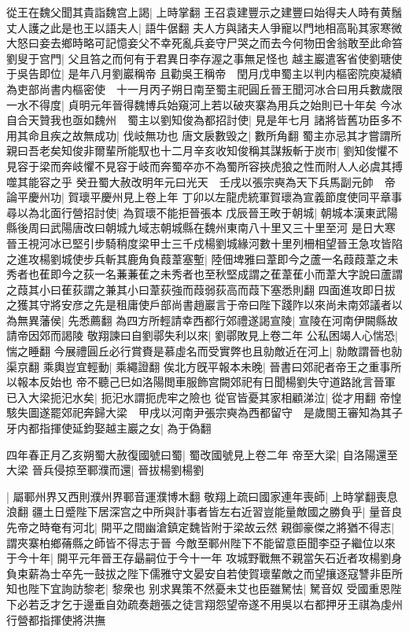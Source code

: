 從王在魏父聞其貴詣魏宫上謁|{
	上時掌翻}
王召袁建豐示之建豐曰始得夫人時有黄鬚丈人護之此是也王以語夫人|{
	語牛倨翻}
夫人方與諸夫人爭寵以門地相高恥其家寒微大怒曰妾去鄉時略可記憶妾父不幸死亂兵妾守尸哭之而去今何物田舍翁敢至此命笞劉叟于宫門|{
	父且笞之而何有于君異日李存渥之事無足怪也}
越主巖遣客省使劉瑭使于吳告即位|{
	是年八月劉巖稱帝}
且勸吳王稱帝　閏月戊申蜀主以判内樞密院庾凝績為吏部尚書内樞密使　十一月丙子朔日南至蜀主祀圓丘晉王聞河冰合曰用兵數歲限一水不得度|{
	貞明元年晉得魏博兵始窺河上若以破夾寨為用兵之始則已十年矣}
今冰自合天贊我也亟如魏州　蜀主以劉知俊為都招討使|{
	見是年七月}
諸將皆舊功臣多不用其命且疾之故無成功|{
	伐岐無功也}
唐文扆數毁之|{
	數所角翻}
蜀主亦忌其才嘗謂所親曰吾老矣知俊非爾輩所能馭也十二月辛亥收知俊稱其謀叛斬于炭市|{
	劉知俊懼不見容于梁而奔岐懼不見容于岐而奔蜀卒亦不為蜀所容挾虎狼之性而附人人必虞其搏噬其能容之乎}
癸丑蜀大赦改明年元曰光天　壬戌以張宗奭為天下兵馬副元帥　帝論平慶州功|{
	賀瓌平慶州見上卷上年}
丁卯以左龍虎統軍賀瓌為宣義節度使同平章事尋以為北面行營招討使|{
	為賀瓌不能拒晉張本}
戊辰晉王畋于朝城|{
	朝城本漢東武陽縣後周曰武陽唐改曰朝城九域志朝城縣在魏州東南八十里又三十里至河}
是日大寒晉王視河冰已堅引步騎稍度梁甲士三千戍楊劉城緣河數十里列柵相望晉王急攻皆陷之進攻楊劉城使步兵斬其鹿角負葭葦塞塹|{
	陸佃埤雅曰葦即今之蘆一名葭葭葦之未秀者也萑即今之荻一名蒹蒹萑之未秀者也至秋堅成謂之萑葦萑小而葦大字說曰蘆謂之葭其小曰萑荻謂之兼其小曰葦荻強而葭弱荻高而葭下塞悉則翻}
四面進攻即日拔之獲其守將安彦之先是租庸使戶部尚書趙巖言于帝曰陛下踐阼以來尚未南郊議者以為無異藩侯|{
	先悉薦翻}
為四方所輕請幸西都行郊禮遂謁宣陵|{
	宣陵在河南伊闕縣故請帝因郊而謁陵}
敬翔諫曰自劉鄩失利以來|{
	劉鄩敗見上卷二年}
公私困竭人心惴恐|{
	惴之睡翻}
今展禮圓丘必行賞賚是慕虛名而受實弊也且勍敵近在河上|{
	勍敵謂晉也勍渠京翻}
乘輿豈宜輕動|{
	乘繩證翻}
俟北方旣平報本未晚|{
	晉書曰郊祀者帝王之重事所以報本反始也}
帝不聽己巳如洛陽閲車服飾宫闕郊祀有日聞楊劉失守道路訛言晉軍已入大梁扼汜水矣|{
	扼汜水謂扼虎牢之險也}
從官皆憂其家相顧涕泣|{
	從才用翻}
帝惶駭失圖遂罷郊祀奔歸大梁　甲戌以河南尹張宗奭為西都留守　是歲閩王審知為其子牙内都指揮使延鈞娶越主巖之女|{
	為于偽翻}


四年春正月乙亥朔蜀大赦復國號曰蜀|{
	蜀改國號見上卷二年}
帝至大梁|{
	自洛陽還至大梁}
晉兵侵掠至鄆濮而還|{
	晉拔楊劉楊劉}


|{
	屬鄆州界又西則濮州界鄆音運濮博木翻}
敬翔上疏曰國家連年喪師|{
	上時掌翻喪息浪翻}
疆土日蹙陛下居深宫之中所與計事者皆左右近習豈能量敵國之勝負乎|{
	量音良}
先帝之時奄有河北|{
	開平之間幽滄鎮定魏皆附于梁故云然}
親御豪傑之將猶不得志|{
	謂夾寨柏鄉蓨縣之師皆不得志于晉}
今敵至鄆州陛下不能留意臣聞李亞子繼位以來于今十年|{
	開平元年晉王存朂嗣位于今十一年}
攻城野戰無不親當矢石近者攻楊劉身負束薪為士卒先一鼓拔之陛下儒雅守文晏安自若使賀瓌輩敵之而望攘逐寇讐非臣所知也陛下宜詢訪黎老|{
	黎衆也}
别求異策不然憂未艾也臣雖駑怯|{
	駑音奴}
受國重恩陛下必若乏才乞于邊垂自効疏奏趙張之徒言翔怨望帝遂不用吳以右都押牙王祺為虔州行營都指揮使將洪撫

